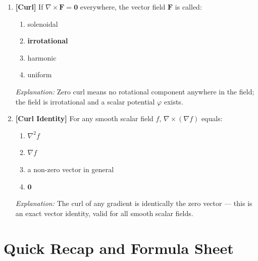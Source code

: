 \documentclass[12pt,a4paper]{article}
\begin{document}
\begin{enumerate}[leftmargin=*, label=\textbf{MCQ \arabic*.}]
  \item \textbf{[Curl]} If $\nabla \times \mathbf{F} = \mathbf{0}$ everywhere, the vector field $\mathbf{F}$ is called:
  \begin{enumerate}[label=(\alph*)]
    \item solenoidal
    \item \textbf{irrotational}
    \item harmonic
    \item uniform
  \end{enumerate}
  \textit{Explanation:} Zero curl means no rotational component anywhere in the field; the field is irrotational and a scalar potential $\varphi$ exists.

  \item \textbf{[Curl Identity]} For any smooth scalar field $f$, $\nabla \times (\nabla f)$ equals:
  \begin{enumerate}[label=(\alph*)]
    \item $\nabla^2 f$
    \item $\nabla f$
    \item a non-zero vector in general
    \item \textbf{$\mathbf{0}$}
  \end{enumerate}
  \textit{Explanation:} The curl of any gradient is identically the zero vector --- this is an exact vector identity, valid for all smooth scalar fields.
\end{enumerate}

\section{Quick Recap and Formula Sheet}
\end{document}
